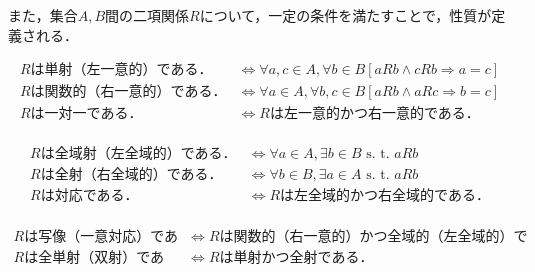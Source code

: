 また，集合$A, B$間の二項関係$R$について，一定の条件を満たすことで，性質が定義される．
\begin{definition}[一意性]
	\begin{align*}
		\text{$R$は単射（左一意的）である．} &\Leftrightarrow \forall a, c \in A, \forall b \in B \left[aRb \wedge cRb \Rightarrow a = c \right] \\
		\text{$R$は関数的（右一意的）である．} &\Leftrightarrow \forall a \in A, \forall b, c \in B \left[aRb \wedge aRc \Rightarrow b = c \right] \\
		\text{$R$は一対一である．} &\Leftrightarrow \text{$R$は左一意的かつ右一意的である．} \\
	\end{align*}
\end{definition}
\begin{definition}[全域性]
	\begin{align*}
	\text{$R$は全域射（左全域的）である．} &\Leftrightarrow \forall a \in A, \exists b \in B \text{ s. t. } aRb \\
	\text{$R$は全射（右全域的）である．} &\Leftrightarrow \forall b \in B, \exists a \in A \text{ s. t. } aRb \\
	\text{$R$は対応である．} &\Leftrightarrow \text{$R$は左全域的かつ右全域的である．} \\
	\end{align*}
\end{definition}
\begin{definition}[写像および全単射]
	\begin{align*}
	\text{$R$は写像（一意対応）である．} &\Leftrightarrow \text{$R$は関数的（右一意的）かつ全域的（左全域的）である．} \\
	\text{$R$は全単射（双射）である．} &\Leftrightarrow \text{$R$は単射かつ全射である．} \\
	\end{align*}
\end{definition}

